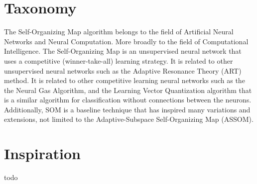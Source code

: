 \documentclass[a4paper, 11pt]{article}
\begin{document}
\section{Taxonomy}
\label{sec:taxonomy}
The Self-Organizing Map algorithm belongs to the field of Artificial Neural Networks and Neural Computation. More broadly to the field of Computational Intelligence.  
The Self-Organizing Map is an unsupervised neural network that uses a competitive (winner-take-all) learning strategy.
It is related to other unsupervised neural networks such as the Adaptive Resonance Theory (ART) method.
It is related to other competitive learning neural networks such as the the Neural Gas Algorithm, and the Learning Vector Quantization algorithm that is a similar algorithm for classification without connections between the neurons. 
Additionally, SOM is a baseline technique that has inspired many variations and extensions, not limited to the Adaptive-Subspace Self-Organizing Map (ASSOM).

\section{Inspiration}
\label{sec:inspiration}
todo
\end{document}
